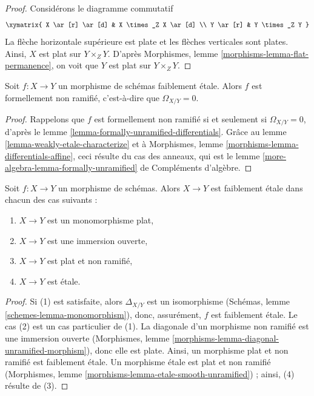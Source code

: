 \begin{proof}
Considérons le diagramme commutatif
$$
\xymatrix{
X \ar[r] \ar[d] & X \times_Z X \ar[d] \\
Y \ar[r] & Y \times_Z Y
}
$$
La flèche horizontale supérieure est plate et les flèches verticales sont plates.
Ainsi, $X$ est plat sur $Y \times_Z Y$. D'après
Morphismes, lemme \ref{morphisms-lemma-flat-permanence},
on voit que $Y$ est plat sur $Y \times_Z Y$.
\end{proof}

\begin{lemma}
\label{lemma-weakly-etale-formally-unramified}
Soit $f : X \to Y$ un morphisme de schémas faiblement \'etale.
Alors $f$ est formellement non ramifié, c'est-à-dire que $\Omega_{X/Y} = 0$.
\end{lemma}

\begin{proof}
Rappelons que $f$ est formellement non ramifié si et seulement si $\Omega_{X/Y} = 0$, d'après le
lemme \ref{lemma-formally-unramified-differentials}.
Grâce au lemme \ref{lemma-weakly-etale-characterize} et à
Morphismes, lemme \ref{morphisms-lemma-differentials-affine},
ceci résulte du cas des anneaux, qui est le
lemme \ref{more-algebra-lemma-formally-unramified} de Compléments d'algèbre.
\end{proof}

\begin{lemma}
\label{lemma-when-weakly-etale}
Soit $f : X \to Y$ un morphisme de schémas. Alors $X \to Y$ est faiblement \'etale
dans chacun des cas suivants :
\begin{enumerate}
\item $X \to Y$ est un monomorphisme plat,
\item $X \to Y$ est une immersion ouverte,
\item $X \to Y$ est plat et non ramifié,
\item $X \to Y$ est \'etale.
\end{enumerate}
\end{lemma}

\begin{proof}
Si (1) est satisfaite, alors $\Delta_{X/Y}$ est un isomorphisme
(Schémas, lemme \ref{schemes-lemma-monomorphism}), donc, assurément,
$f$ est faiblement \'etale. Le cas (2) est un cas particulier de (1).
La diagonale d'un morphisme non ramifié est une immersion ouverte
(Morphismes, lemme \ref{morphisms-lemma-diagonal-unramified-morphism}),
donc elle est plate. Ainsi, un morphisme plat et non ramifié est faiblement \'etale.
Un morphisme \'etale est plat et non ramifié
(Morphismes, lemme \ref{morphisms-lemma-etale-smooth-unramified}) ;
ainsi, (4) résulte de (3).
\end{proof}


